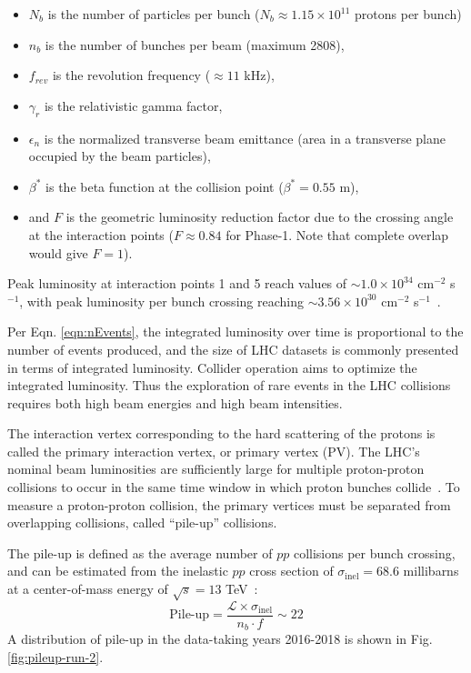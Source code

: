 \begin{itemize}
    \item $N_b$ is the number of particles per bunch ($N_b \approx 1.15 \times 10^{11}$ protons per bunch)
    \item $n_b$ is the number of bunches per beam (maximum 2808),
    \item $f_{rev}$ is the revolution frequency ($\approx 11$ kHz),
    \item $\gamma_r$ is the relativistic gamma factor,
    \item $\epsilon_n$ is the normalized transverse beam emittance (area in a transverse plane occupied by the beam particles),
    \item $\beta^*$ is the beta function at the collision point ($\beta^* = 0.55$ m),
    \item and $F$ is the geometric luminosity reduction factor due to the crossing angle at the interaction points ($F \approx 0.84$ for Phase-1. Note that complete overlap would give $F = 1$).
\end{itemize}
Peak luminosity at interaction points 1 and 5 reach values of $\sim 1.0 \times 10^{34}$ cm$^{-2}$ s$^{-1}$, with peak luminosity per bunch crossing reaching $\sim 3.56 \times 10^{30}$ cm$^{-2}$ s$^{-1}$~\cite{LHC-phase-1-design-report}.

Per Eqn. \ref{eqn:nEvents}, the integrated luminosity over time is proportional to the number of events produced, and the size of LHC datasets is commonly presented in terms of integrated luminosity. Collider operation aims to optimize the integrated luminosity. Thus the exploration of rare events in the LHC collisions requires both high beam energies and high beam intensities.

The interaction vertex corresponding to the hard scattering of the protons is called the primary interaction vertex, or primary vertex (PV). The LHC's nominal beam luminosities are sufficiently large for multiple proton-proton collisions to occur in the same time window in which proton bunches collide~\cite{CMS-JME-18-001}. To measure a proton-proton collision, the primary vertices must be separated from overlapping collisions, called ``pile-up'' collisions.

The pile-up is defined as the average number of $pp$ collisions per bunch crossing, and can be estimated from the inelastic $pp$ cross section of $\sigma_{\text{inel}} = 68.6$ millibarns at a center-of-mass energy of $\sqrt{s} = 13$ TeV~\cite{CERN-EP-2018-004-pileup}:
\begin{equation}
    \text{Pile-up} = \frac{\mathcal{L} \times \sigma_{\text{inel}}}{ n_b \cdot f} \sim 22
\end{equation}
A distribution of pile-up in the data-taking years 2016-2018 is shown in Fig. \ref{fig:pileup-run-2}.

